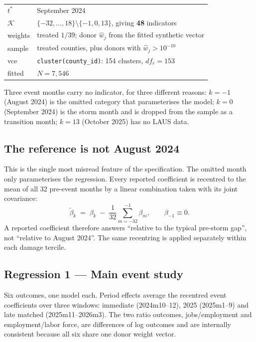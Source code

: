 \documentclass[11pt,a4paper]{article}
\begin{document}
\begin{center}
\small
\begin{tabular}{@{}lp{9.3cm}@{}}
\toprule
$t^\ast$ & September 2024 \\
$\mathcal{K}$ & $\{-32,\dots,18\}\setminus\{-1,0,13\}$, giving \textbf{48} indicators \\
weights & treated $1/39$; donor $\hat w_j$ from the fitted synthetic vector \\
sample & treated counties, plus donors with $\hat w_j > 10^{-10}$ \\
vce & \texttt{cluster(county\_id)}: 154 clusters, $df_r = 153$ \\
fitted & $N = 7{,}546$ \\
\bottomrule
\end{tabular}
\end{center}

\noindent Three event months carry no indicator, for three different reasons:
$k=-1$ (August 2024) is the omitted category that parameterises the model;
$k=0$ (September 2024) is the storm month and is dropped from the sample as a
transition month; $k=13$ (October 2025) has no LAUS data.

\subsection{The reference is not August 2024}

This is the single most misread feature of the specification. The omitted month
only parameterises the regression. Every reported coefficient is recentred to
the mean of all 32 pre-event months by a linear combination taken with its
joint covariance:
\[
\tilde\beta_k \;=\; \beta_k \;-\; \frac{1}{32}\sum_{m=-32}^{-1}\beta_m ,
\qquad \beta_{-1}\equiv 0 .
\]
A reported coefficient therefore answers ``relative to the typical pre-storm
gap'', not ``relative to August 2024''. The same recentring is applied
separately within each damage tercile.

\subsection{Regression 1 --- Main event study}

Six outcomes, one model each. Period effects average the recentred event
coefficients over three windows: immediate (2024m10--12), 2025 (2025m1--9) and
late matched (2025m11--2026m3). The two ratio outcomes, jobs/employment and
employment/labor force, are differences of log outcomes and are internally
consistent because all six share one donor weight vector.
\end{document}
